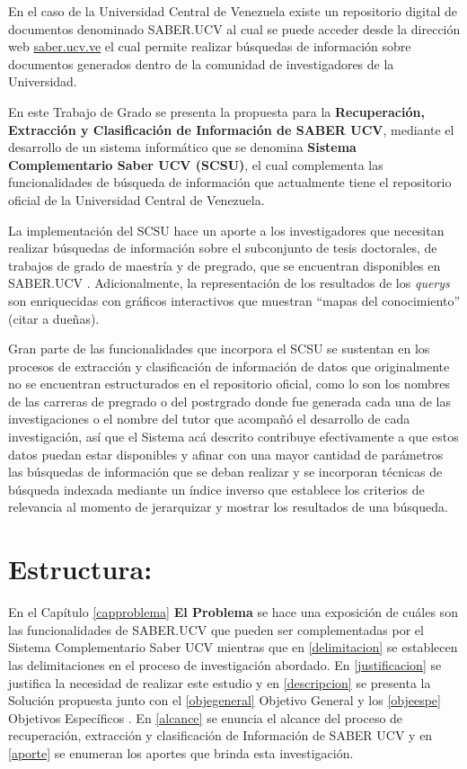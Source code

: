 \documentclass[
  10,
  openany]{book}
\begin{document}
En el caso de la Universidad Central de Venezuela existe un repositorio digital de documentos denominado SABER.UCV al cual se puede acceder desde la dirección web \href{http://saber.ucv.ve/}{saber.ucv.ve} el cual permite realizar búsquedas de información sobre documentos generados dentro de la comunidad de investigadores de la Universidad.

En este Trabajo de Grado se presenta la propuesta para la \textbf{Recuperación, Extracción y Clasificación de Información de SABER UCV}, mediante el desarrollo de un sistema informático que se denomina \textbf{Sistema Complementario Saber UCV (SCSU)}, el cual complementa las funcionalidades de búsqueda de información que actualmente tiene el repositorio oficial de la Universidad Central de Venezuela.

La implementación del SCSU hace un aporte a los investigadores que necesitan realizar búsquedas de información sobre el subconjunto de tesis doctorales, de trabajos de grado de maestría y de pregrado, que se encuentran disponibles en SABER.UCV . Adicionalmente, la representación de los resultados de los \emph{querys} son enriquecidas con gráficos interactivos que muestran ``mapas del conocimiento'' (citar a dueñas).

Gran parte de las funcionalidades que incorpora el SCSU se sustentan en los procesos de extracción y clasificación de información de datos que originalmente no se encuentran estructurados en el repositorio oficial, como lo son los nombres de las carreras de pregrado o del postrgrado donde fue generada cada una de las investigaciones o el nombre del tutor que acompañó el desarrollo de cada investigación, así que el Sistema acá descrito contribuye efectivamente a que estos datos puedan estar disponibles y afinar con una mayor cantidad de parámetros las búsquedas de información que se deban realizar y se incorporan técnicas de búsqueda indexada mediante un índice inverso que establece los criterios de relevancia al momento de jerarquizar y mostrar los resultados de una búsqueda.

\hypertarget{estructura}{%
\section{Estructura:}\label{estructura}}

En el Capítulo \ref{capproblema} \textbf{El Problema} se hace una exposición de cuáles son las funcionalidades de SABER.UCV que pueden ser complementadas por el Sistema Complementario Saber UCV mientras que en \ref{delimitacion} se establecen las delimitaciones en el proceso de investigación abordado. En \ref{justificacion} se justifica la necesidad de realizar este estudio y en \ref{descripcion} se presenta la Solución propuesta junto con el \ref{objegeneral} Objetivo General y los \ref{objeespe} Objetivos Específicos . En \ref{alcance} se enuncia el alcance del proceso de recuperación, extracción y clasificación de Información de SABER UCV y en \ref{aporte} se enumeran los aportes que brinda esta investigación.
\end{document}
